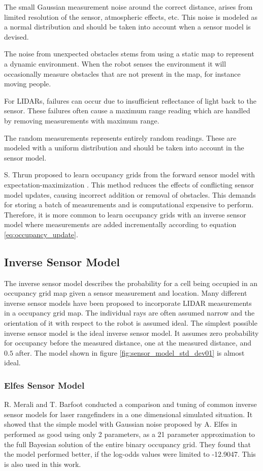 The small Gaussian measurement noise around the correct distance, arises from limited resolution of the sensor, atmospheric effects, etc. This noise is modeled as a normal distribution and should be taken into account when a sensor model is devised. 

The noise from unexpected obstacles stems from using a static map to represent a dynamic environment. When the robot senses the environment it will occasionally measure obstacles that are not present in the map, for instance moving people.

For LIDARs, failures can occur due to insufficient reflectance of light back to the sensor. 
These failures often cause a maximum range reading which are handled by removing measurements with maximum range.

The random measurements represents entirely random readings. These are modeled with a uniform distribution and should be taken into account in the sensor model.

S. Thrun proposed to learn occupancy grids from the forward sensor model with expectation-maximization \cite{probRob}.
This method reduces the effects of conflicting sensor model updates, causing incorrect addition or removal of obstacles. 
This demands for storing a batch of measurements and is computational expensive to perform. 
Therefore, it is more common to learn occupancy grids with an inverse sensor model where measurements are added incrementally according to equation \vref{eq:occupancy_update}. 

\subsection{Inverse Sensor Model}
The inverse sensor model describes the probability for a cell being occupied in an occupancy grid map given a sensor measurement and location. 
Many different inverse sensor models have been proposed to incorporate LIDAR measurements in a occupancy grid map. The individual rays are often assumed narrow and the orientation of it with respect to the robot is assumed ideal.
The simplest possible inverse sensor model is the 
ideal inverse sensor model. It assumes zero probability for occupancy before the measured distance, one at the measured distance, and $0.5$ after. The model shown in figure \vref{fig:sensor_model_std_dev01} is almost ideal.

\subsubsection{Elfes Sensor Model}
R. Merali and T. Barfoot \cite{sensorModelTuning} conducted a comparison and tuning of common inverse sensor models for laser rangefinders in a one dimensional simulated situation. It showed that the simple model with Gaussian noise proposed by A. Elfes in \cite{elfes} performed as good using only 2 parameters, as a 21 parameter approximation to the full Bayesian solution of the entire binary occupancy grid. They found that the model performed better, if the log-odds values were limited to -12.9047. This is also used in this work.

